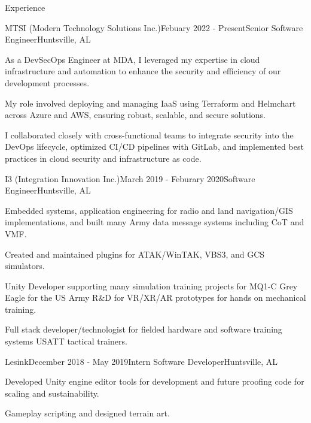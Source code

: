\documentclass[
	11pt, %
]{crumpcv} %
\begin{document}
\begin{rSection}{Experience}

	\begin{rSubsection}{MTSI (Modern Technology Solutions Inc.)}{Febuary 2022 - Present}{Senior Software Engineer}{Huntsville, AL}
		\item As a DevSecOps Engineer at MDA, I leveraged my expertise in cloud infrastructure and automation to enhance the security and efficiency of our development processes. 
		\item My role involved deploying and managing IaaS using Terraform and Helmchart across Azure and AWS, ensuring robust, scalable, and secure solutions. 
		\item I collaborated closely with cross-functional teams to integrate security into the DevOps lifecycle, optimized CI/CD pipelines with GitLab, and implemented best practices in cloud security and infrastructure as code.
	\end{rSubsection}


	\begin{rSubsection}{I3 (Integration Innovation Inc.)}{March 2019 - Feburary 2020}{Software Engineer}{Huntsville, AL}
		\item Embedded systems, application engineering for radio and land navigation/GIS implementations, and built many Army data message systems including CoT and VMF. 
		\item Created and maintained plugins for ATAK/WinTAK, VBS3, and GCS simulators.
		\item Unity Developer supporting many simulation training projects for MQ1-C Grey Eagle for the US Army R\&D for VR/XR/AR prototypes for hands on mechanical training.
		\item Full stack developer/technologist for fielded hardware and software training systems USATT tactical trainers.
	\end{rSubsection}


	\begin{rSubsection}{Lesink}{December 2018 - May 2019}{Intern Software Developer}{Huntsville, AL}
		\item Developed Unity engine editor tools for development and future proofing code for scaling and sustainability.
		\item Gameplay scripting and designed terrain art.
	\end{rSubsection}


\end{rSection}
\end{document}
